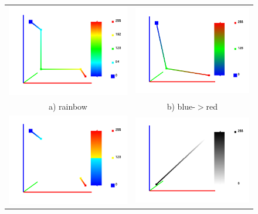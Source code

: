 \documentclass[11pt,twoside]{book}
\begin{document}
\begin{figure}[bph]
\begin{center}
\begin{tabular}{cc}
\includegraphics[width=3.25in]{FIGURES/colorbar_rainbow}&
\includegraphics[width=3.25in]{FIGURES/colorbar_bluered}\\
a) rainbow&b) blue-$>$red\\
\includegraphics[width=3.25in]{FIGURES/colorbar_split}&
\includegraphics[width=3.25in]{FIGURES/colorbar_whiteblack}\\

\end{tabular}
\end{center}
\end{figure}
\end{document}
